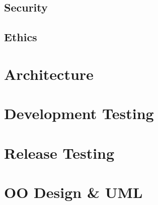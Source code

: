 \documentclass[10pt]{article}
\begin{document}
\subsection{Security}
\subsection{Ethics}


\section{Architecture}


\section{Development Testing}


\section{Release Testing}


\section{OO Design \& UML}
\end{document}

